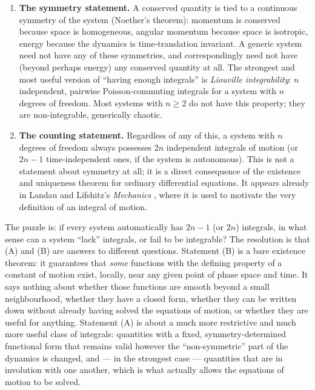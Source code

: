 \documentclass[11pt]{article}
\theoremstyle{definition}
\theoremstyle{remark}
\begin{document}
\begin{enumerate}[label=(\Alph*)]
\item \textbf{The symmetry statement.} A conserved quantity is tied to a
continuous symmetry of the system (Noether's theorem): momentum is
conserved because space is homogeneous, angular momentum because space is
isotropic, energy because the dynamics is time-translation invariant. A
generic system need not have any of these symmetries, and correspondingly
need not have (beyond perhaps energy) any conserved quantity at all. The
strongest and most useful version of ``having enough integrals'' is
\emph{Liouville integrability}: $n$ independent, pairwise Poisson-commuting
integrals for a system with $n$ degrees of freedom. Most systems with
$n\ge 2$ do not have this property; they are non-integrable, generically
chaotic.
\item \textbf{The counting statement.} Regardless of any of this, a system
with $n$ degrees of freedom always possesses $2n$ independent integrals of
motion (or $2n-1$ time-independent ones, if the system is autonomous). This
is not a statement about symmetry at all; it is a direct consequence of the
existence and uniqueness theorem for ordinary differential equations. It
appears already in Landau and Lifshitz's \emph{Mechanics} \cite{landau},
where it is used to motivate the very definition of an integral of motion.
\end{enumerate}

The puzzle is: if every system automatically has $2n-1$ (or $2n$)
integrals, in what sense can a system ``lack'' integrals, or fail to be
integrable? The resolution is that (A) and (B) are answers to different
questions. Statement (B) is a bare existence theorem: it guarantees that
\emph{some} functions with the defining property of a constant of motion
exist, locally, near any given point of phase space and time. It says
nothing about whether those functions are smooth beyond a small
neighbourhood, whether they have a closed form, whether they can be written
down without already having solved the equations of motion, or whether they
are useful for anything. Statement (A) is about a much more restrictive and
much more useful class of integrals: quantities with a fixed, symmetry-determined
functional form that remains valid however the ``non-symmetric'' part of the
dynamics is changed, and --- in the strongest case --- quantities that are
in involution with one another, which is what actually allows the equations
of motion to be solved.
\end{document}
